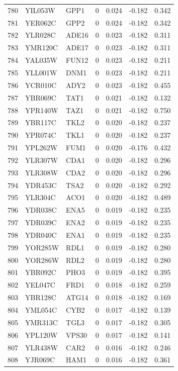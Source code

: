 \begin{longtable}{rllrrrr}
780 & YIL053W & GPP1 & 0 & 0.024 & -0.182 & 0.342\\
781 & YER062C & GPP2 & 0 & 0.024 & -0.182 & 0.342\\
782 & YLR028C & ADE16 & 0 & 0.023 & -0.182 & 0.311\\
783 & YMR120C & ADE17 & 0 & 0.023 & -0.182 & 0.311\\
784 & YAL035W & FUN12 & 0 & 0.023 & -0.182 & 0.211\\
785 & YLL001W & DNM1 & 0 & 0.023 & -0.182 & 0.211\\
786 & YCR010C & ADY2 & 0 & 0.023 & -0.182 & 0.455\\
787 & YBR069C & TAT1 & 0 & 0.021 & -0.182 & 0.132\\
788 & YPR140W & TAZ1 & 0 & 0.021 & -0.182 & 0.750\\
789 & YBR117C & TKL2 & 0 & 0.020 & -0.182 & 0.237\\
790 & YPR074C & TKL1 & 0 & 0.020 & -0.182 & 0.237\\
791 & YPL262W & FUM1 & 0 & 0.020 & -0.176 & 0.432\\
792 & YLR307W & CDA1 & 0 & 0.020 & -0.182 & 0.296\\
793 & YLR308W & CDA2 & 0 & 0.020 & -0.182 & 0.296\\
794 & YDR453C & TSA2 & 0 & 0.020 & -0.182 & 0.292\\
795 & YLR304C & ACO1 & 0 & 0.020 & -0.182 & 0.489\\
796 & YDR038C & ENA5 & 0 & 0.019 & -0.182 & 0.235\\
797 & YDR039C & ENA2 & 0 & 0.019 & -0.182 & 0.235\\
798 & YDR040C & ENA1 & 0 & 0.019 & -0.182 & 0.235\\
799 & YOR285W & RDL1 & 0 & 0.019 & -0.182 & 0.280\\
800 & YOR286W & RDL2 & 0 & 0.019 & -0.182 & 0.280\\
801 & YBR092C & PHO3 & 0 & 0.019 & -0.182 & 0.395\\
802 & YEL047C & FRD1 & 0 & 0.018 & -0.182 & 0.259\\
803 & YBR128C & ATG14 & 0 & 0.018 & -0.182 & 0.169\\
804 & YML054C & CYB2 & 0 & 0.017 & -0.182 & 0.139\\
805 & YMR313C & TGL3 & 0 & 0.017 & -0.182 & 0.305\\
806 & YPL120W & VPS30 & 0 & 0.017 & -0.182 & 0.141\\
807 & YLR438W & CAR2 & 0 & 0.016 & -0.182 & 0.246\\
808 & YJR069C & HAM1 & 0 & 0.016 & -0.182 & 0.361\\

\end{longtable}
